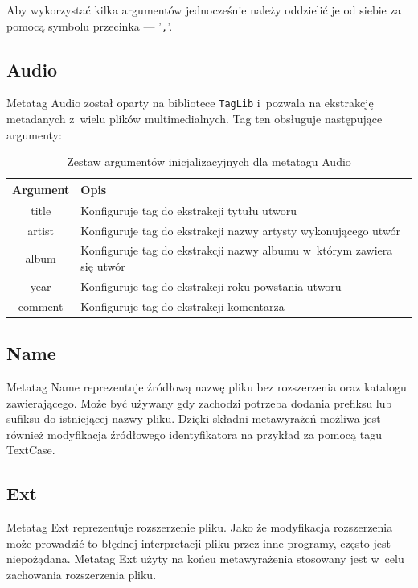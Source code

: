 Aby wykorzystać kilka argumentów jednocześnie należy oddzielić je od siebie za pomocą symbolu przecinka --- '\texttt{,}'.

\subsection{Audio}
Metatag Audio został oparty na bibliotece \texttt{TagLib} i~pozwala na ekstrakcję metadanych z~wielu plików multimedialnych.
Tag ten obsługuje następujące argumenty:
\begin{table}[h]
\begin{center}
\begin{tabular}{| c | p{13cm} |}
\hline
\textbf{Argument} & \textbf{Opis} \\
\hline
title & Konfiguruje tag do ekstrakcji tytułu utworu \\
artist & Konfiguruje tag do ekstrakcji nazwy artysty wykonującego utwór \\
album & Konfiguruje tag do ekstrakcji nazwy albumu w~którym zawiera się utwór \\
year & Konfiguruje tag do ekstrakcji roku powstania utworu \\
comment & Konfiguruje tag do ekstrakcji komentarza \\
\hline

\end{tabular}
\caption{Zestaw argumentów inicjalizacyjnych dla metatagu \textsf{Audio}}
\end{center}
\end{table}

\subsection{Name}
Metatag Name reprezentuje źródłową nazwę pliku bez rozszerzenia oraz katalogu zawierającego. Może być używany gdy zachodzi potrzeba dodania prefiksu lub sufiksu do istniejącej nazwy pliku. Dzięki składni metawyrażeń możliwa jest również modyfikacja źródłowego identyfikatora na przykład za pomocą tagu TextCase.

\subsection{Ext}
Metatag Ext reprezentuje rozszerzenie pliku. Jako że modyfikacja rozszerzenia może prowadzić to błędnej interpretacji pliku przez inne programy, często jest niepożądana. Metatag Ext użyty na końcu metawyrażenia stosowany jest w~celu zachowania rozszerzenia pliku.

